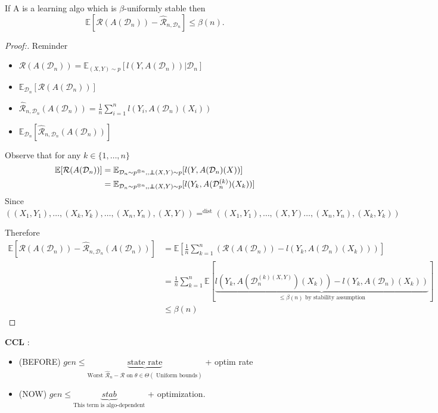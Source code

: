 \begin{thm}
    If A is a learning algo which is $ \beta  $-uniformly stable then 
    \[
        \mathbb{E}[ \mathcal{R}(A(\mathcal{D}_n)) - \hat{\mathcal{R}}_{n,\mathcal{D}_n}] \leq \beta (n)
    .\]
\end{thm}
\begin{proof}[Proof:]
    Reminder \begin{itemize}
        \item $ \mathcal{R} (A(\mathcal{D}_n)) = \mathbb{E}_{(X,Y) \sim p}[ l(Y, A(\mathcal{D}_n)) | \mathcal{D}_n] $ 
        \item $ \mathbb{E}_{\mathcal{D}_n} [ \mathcal{R}(A (\mathcal{D}_n))] $ 
        \item $ \hat{\mathcal{R}}_{n, \mathcal{D}_n} (A(\mathcal{D}_n)) = \frac{1}{n} \sum_{i=1}^{n } l (Y_i, A(\mathcal{D}_n) (X_i)) $ 
        \item $ \mathbb{E}_{\mathcal{D}_n} [ \hat{\mathcal{R}}_{n, \mathcal{D}_n}(A (\mathcal{D}_n))] $ 
    \end{itemize}
    Observe that for any $ k \in \{1, \dots, n\} $ 
    \begin{align*}
        \mathbb{E} [\mathcal{R}(A(\mathcal{D}_n))]
            &= \mathbb{E}_{ \mathcal{D}_n \sim p^{\otimes n} ,, \ind (X,Y)\sim p} [ l(Y, A (\mathcal{D}_n) (X)) ] \\
            &= \mathbb{E}_{ \mathcal{D}_n \sim p^{\otimes n} ,, \ind (X,Y)\sim p} [ l(Y_k, A(\mathcal{D}_n^{(k)}) (X_k))]
    \end{align*}
    Since $ ( (X_1, Y_1), \dots, (X_k, Y_k), \dots, (X_n, Y_n), (X,Y) ) = ^{\text{dist}} ( (X_1, Y_1), \dots, (X, Y) \dots, (X_n, Y_n), (X_k,Y_k) )$ 

    Therefore
    \begin{align*}
        \mathbb{E} [\mathcal{R}(A(\mathcal{D}_n)) - \hat{\mathcal{R}}_{n, \mathcal{D}_n} (A(\mathcal{D}_n))] 
            &= \mathbb{E}[ \frac{1}{n} \sum_{k=1}^{n} ( \mathcal{R} (A ( \mathcal{D}_n) ) - l ( Y_k, A(\mathcal{D}_n) (X_k)))] \\
            &= \frac{1}{n} \sum_{k=1 }^{n} \mathbb{E}[ \underbrace{l( Y_k, A(\mathcal{D}_n ^{(k) (X,Y) })(X_k) ) -l (Y_k , A(\mathcal{D}_n) (X_k))}_{ \leq \beta (n) \text{ by stability assumption}} ] \\
            &\leq \beta (n)
    \end{align*}
\end{proof}

\textbf{CCL} : 
\begin{itemize}
    \item (BEFORE) $ gen \leq \underbrace{\text{state rate}}_{\text{Worst } \hat{\mathcal{R}}_n - \mathcal{R} \text{ on } \theta \in \Theta ( \text{ Uniform bounds})}$ + optim rate \\
    \item (NOW) $ gen \leq \underbrace{stab}_{\text{This term is algo-dependent}} $ + optimization.
\end{itemize}


